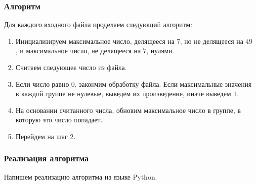 \documentclass{beamer}
\begin{document}
\begin{frame}

    \frametitle{Алгоритм}

    Для каждого входного файла проделаем следующий алгоритм:

    \begin{enumerate}

        \item Инициализируем максимальное число, делящееся на $7$, но не делящееся на $49$, и максимальное число, не делящееся на $7$, нулями.

        \item Считаем следующее число из файла.

        \item Если число равно $0$, закончим обработку файла. Если максимальные значения в каждой группе не нулевые, выведем их произведение, иначе выведем $1$.

        \item На основании считанного числа, обновим максимальное число в группе, в которую это число попадает.

        \item Перейдем на шаг 2.

    \end{enumerate}

\end{frame}

\begin{frame}

    \frametitle{Реализация алгоритма}

    Напишем реализацию алгоритма на языке Python.

    \inputminted[frame=single, fontsize=\footnotesize]{python}{src/task_27/solution.py}

\end{frame}
\end{document}
